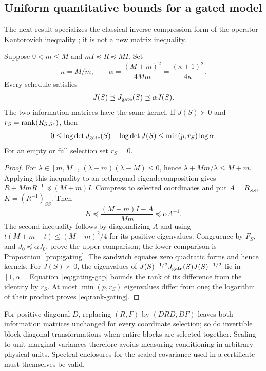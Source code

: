 \subsection{Uniform quantitative bounds for a gated model}
\label{subsec:gating-bounds}
The next result specializes the classical inverse-compression form of the
operator Kantorovich inequality \citep[Eq.~(1)]{Moradi2019}; it is not a new
matrix inequality.

\begin{proposition}
\label{prop:kantorovich}
Suppose $0<m\le M$ and $mI\preceq R\preceq MI$. Set
\begin{equation}
 \kappa=M/m,\qquad \alpha=\frac{(M+m)^2}{4Mm}
 =\frac{(\kappa+1)^2}{4\kappa}.
 \label{eq:alpha}
\end{equation}
Every schedule satisfies
\begin{equation}
 J(S)\preceq J_{\mathrm{gate}}(S)\preceq\alpha J(S).
 \label{eq:uniform-gating}
\end{equation}
The two information matrices have the same kernel. If $J(S)\succ0$ and
$r_S=\operatorname{rank}(R_{S,S^c})$, then
\begin{equation}
 0\le\log\det J_{\mathrm{gate}}(S)-\log\det J(S)
 \le\min(p,r_S)\log\alpha.
 \label{eq:rank-gating}
\end{equation}
For an empty or full selection set $r_S=0$.
\end{proposition}
\begin{proof}
For $\lambda\in[m,M]$, $(\lambda-m)(\lambda-M)\le0$, hence
$\lambda+Mm/\lambda\le M+m$. Applying this inequality to an orthogonal
eigendecomposition gives $R+MmR^{-1}\preceq(M+m)I$. Compress to selected
coordinates and put $A=R_{SS}$, $K=(R^{-1})_{SS}$. Then
\[
 K\preceq\frac{(M+m)I-A}{Mm}\preceq\alpha A^{-1}.
\]
The second inequality follows by diagonalizing $A$ and using
$t(M+m-t)\le(M+m)^2/4$ for its positive eigenvalues. Congruence by $F_S$,
and $J_0\preceq\alpha J_0$, prove the upper comparison; the lower comparison
is Proposition~\ref{prop:gating}. The sandwich equates zero quadratic forms
and hence kernels.
For $J(S)\succ0$, the eigenvalues of
$J(S)^{-1/2}J_{\mathrm{gate}}(S)J(S)^{-1/2}$ lie in $[1,\alpha]$.
Equation~\eqref{eq:gating-gap} bounds the rank of its difference from the
identity by $r_S$. At most $\min(p,r_S)$ eigenvalues differ from one;
the logarithm of their product proves \eqref{eq:rank-gating}.
\end{proof}

For positive diagonal $D$, replacing $(R,F)$ by $(DRD,DF)$ leaves both
information matrices unchanged for every coordinate selection; so do
invertible block-diagonal transformations when entire blocks are selected
together. Scaling to unit marginal variances therefore avoids measuring
conditioning in arbitrary physical units. Spectral enclosures for the scaled
covariance used in a certificate must themselves be valid.

